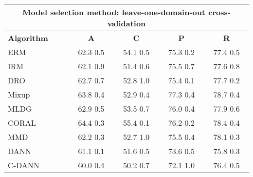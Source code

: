 \documentclass{article}
\begin{document}
\begin{center}
\begin{tabular}{lcccc}
\toprule
\multicolumn{5}{c}{\textbf{Model selection method: leave-one-domain-out cross-validation}} \\
\midrule
\textbf{Algorithm}    & \textbf{A}                & \textbf{C}                & \textbf{P}                & \textbf{R}                \\
\midrule
ERM                       & 62.3  0.5            & 54.1  0.5            & 75.3  0.2            & 77.4  0.5            \\
IRM                       & 62.1  0.9            & 51.4  0.6            & 75.5  0.7            & 77.6  0.8            \\
DRO                 & 62.7  0.7            & 52.8  1.0            & 75.4  0.1            & 77.7  0.2            \\
Mixup                     & 63.8  0.4            & 52.9  0.4            & 77.3  0.4            & 78.7  0.4            \\
MLDG                      & 62.9  0.5            & 53.5  0.7            & 76.0  0.4            & 77.9  0.6            \\
CORAL                     & 64.4  0.3            & 55.4  0.1            & 76.2  0.2            & 78.4  0.4            \\
MMD                       & 62.2  0.3            & 52.7  1.0            & 75.5  0.4            & 78.1  0.3            \\
DANN                       & 61.1  0.1            & 51.6  0.5            & 73.6  0.5            & 75.8  0.3            \\
C-DANN                   & 60.0  0.4            & 50.2  0.7            & 72.1  1.0            & 76.4  0.5            \\
\bottomrule
\end{tabular}
\end{center}
\end{document}
